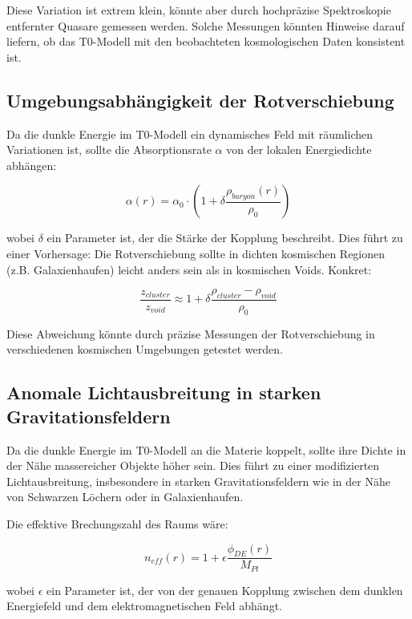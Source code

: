 \documentclass[a4paper,12pt]{article}
\begin{document}
Diese Variation ist extrem klein, könnte aber durch hochpräzise Spektroskopie entfernter Quasare gemessen werden. Solche Messungen könnten Hinweise darauf liefern, ob das T0-Modell mit den beobachteten kosmologischen Daten konsistent ist.

\subsection{Umgebungsabhängigkeit der Rotverschiebung}

Da die dunkle Energie im T0-Modell ein dynamisches Feld mit räumlichen Variationen ist, sollte die Absorptionsrate $\alpha$ von der lokalen Energiedichte abhängen:

\begin{equation}
	\alpha(r) = \alpha_0 \cdot \left(1 + \delta\frac{\rho_{baryon}(r)}{\rho_0}\right)
\end{equation}

wobei $\delta$ ein Parameter ist, der die Stärke der Kopplung beschreibt. Dies führt zu einer Vorhersage: Die Rotverschiebung sollte in dichten kosmischen Regionen (z.B. Galaxienhaufen) leicht anders sein als in kosmischen Voids. Konkret:

\begin{equation}
	\frac{z_{cluster}}{z_{void}} \approx 1 + \delta\frac{\rho_{cluster} - \rho_{void}}{\rho_0}
\end{equation}

Diese Abweichung könnte durch präzise Messungen der Rotverschiebung in verschiedenen kosmischen Umgebungen getestet werden.

\subsection{Anomale Lichtausbreitung in starken Gravitationsfeldern}

Da die dunkle Energie im T0-Modell an die Materie koppelt, sollte ihre Dichte in der Nähe massereicher Objekte höher sein. Dies führt zu einer modifizierten Lichtausbreitung, insbesondere in starken Gravitationsfeldern wie in der Nähe von Schwarzen Löchern oder in Galaxienhaufen.

Die effektive Brechungszahl des Raums wäre:

\begin{equation}
	n_{eff}(r) = 1 + \epsilon \frac{\phi_{DE}(r)}{M_{Pl}}
\end{equation}

wobei $\epsilon$ ein Parameter ist, der von der genauen Kopplung zwischen dem dunklen Energiefeld und dem elektromagnetischen Feld abhängt.
\end{document}
